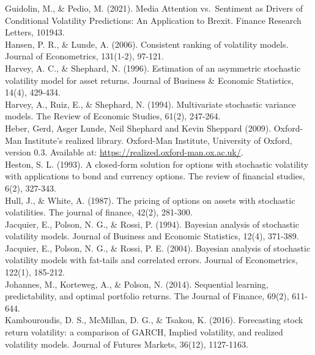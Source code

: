 \documentclass[
]{book}
\theoremstyle{break}
\theoremstyle{nonumberplain}
\begin{document}
Guidolin, M., \& Pedio, M. (2021). Media Attention vs.~Sentiment as
Drivers of Conditional Volatility Predictions: An Application to Brexit.
Finance Research Letters, 101943.\\

Hansen, P. R., \& Lunde, A. (2006). Consistent ranking of volatility
models. Journal of Econometrics, 131(1-2), 97-121.\\

Harvey, A. C., \& Shephard, N. (1996). Estimation of an asymmetric
stochastic volatility model for asset returns. Journal of Business \&
Economic Statistics, 14(4), 429-434.\\

Harvey, A., Ruiz, E., \& Shephard, N. (1994). Multivariate stochastic
variance models. The Review of Economic Studies, 61(2), 247-264.\\

Heber, Gerd, Asger Lunde, Neil Shephard and Kevin Sheppard (2009).
Oxford-Man Institute's realized library. Oxford-Man Institute,
University of Oxford, version 0.3. Available at:
\url{https://realized.oxford-man.ox.ac.uk/}.\\

Heston, S. L. (1993). A closed-form solution for options with stochastic
volatility with applications to bond and currency options. The review of
financial studies, 6(2), 327-343.\\

Hull, J., \& White, A. (1987). The pricing of options on assets with
stochastic volatilities. The journal of finance, 42(2), 281-300.\\

Jacquier, E., Polson, N. G., \& Rossi, P. (1994). Bayesian analysis of
stochastic volatility models. Journal of Business and Economic
Statistics, 12(4), 371-389.\\

Jacquier, E., Polson, N. G., \& Rossi, P. E. (2004). Bayesian analysis
of stochastic volatility models with fat-tails and correlated errors.
Journal of Econometrics, 122(1), 185-212.\\

Johannes, M., Korteweg, A., \& Polson, N. (2014). Sequential learning,
predictability, and optimal portfolio returns. The Journal of Finance,
69(2), 611-644.\\

Kambouroudis, D. S., McMillan, D. G., \& Tsakou, K. (2016). Forecasting
stock return volatility: a comparison of GARCH, Implied volatility, and
realized volatility models. Journal of Futures Markets, 36(12),
1127-1163.\\
\end{document}
